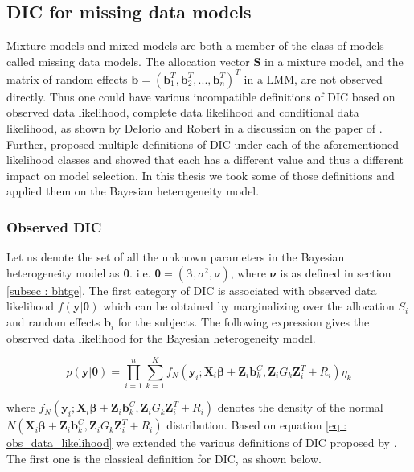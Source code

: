 \subsection{DIC for missing data models}
\label{subsec : DIC_missing_data_models}
Mixture models and mixed models are both a member of the class of models called missing data models. The allocation vector $\boldsymbol{S}$ in a mixture model, and the matrix of random effects $\boldsymbol{b}=(\boldsymbol{b}_1^T, \boldsymbol{b}_2^T, ..., \boldsymbol{b}_n^T)^T$ in a LMM, are not observed directly. Thus one could have various incompatible definitions of DIC based on observed data likelihood, complete data likelihood and conditional data likelihood, as shown by DeIorio and Robert in a discussion on the paper of \citet{spiegelhalter_bayesian_2002}. Further, \citet{celeux_deviance_2006} proposed multiple definitions of DIC under each of the aforementioned likelihood classes and showed that each has a different value and thus a different impact on model selection. In this thesis we took some of those definitions and applied them on the Bayesian heterogeneity model. 

\subsubsection{Observed DIC}
Let us denote the set of all the unknown parameters in the Bayesian heterogeneity model as $\boldsymbol{\theta}$. i.e. $\boldsymbol{\theta} = (\boldsymbol{\beta}, \sigma^2, \boldsymbol{\nu})$, where $\boldsymbol{\nu}$ is as defined in section \ref{subsec : bhtge}. The first category of DIC is associated with observed data likelihood $f(\boldsymbol{y}|\boldsymbol{\theta})$ which can be obtained by marginalizing over the allocation $S_i$ and random effects $\boldsymbol{b}_i$ for the subjects. The following expression gives the observed data likelihood for the Bayesian heterogeneity model.

\begin{equation}
\label{eq : obs_data_likelihood}
p(\boldsymbol{y}|\boldsymbol{\theta}) = \prod_{i=1}^n \sum_{k=1}^K f_N(\boldsymbol{y}_i; \boldsymbol{X}_i\boldsymbol{\beta} + \boldsymbol{Z}_i \boldsymbol{b}_k^C, \boldsymbol{Z}_{i} G_k \boldsymbol{Z}_{i}^T+ R_i) \eta_k
\end{equation}
 
where $f_N(\boldsymbol{y}_i; \boldsymbol{X}_i\boldsymbol{\beta} + \boldsymbol{Z}_i \boldsymbol{b}_k^C, \boldsymbol{Z}_{i} G_k \boldsymbol{Z}_{i}^T+ R_i)$ denotes the density of the normal $N(\boldsymbol{X}_i\boldsymbol{\beta} + \boldsymbol{Z}_i \boldsymbol{b}_k^C, \boldsymbol{Z}_{i} G_k \boldsymbol{Z}_{i}^T+ R_i)$ distribution. Based on equation \ref{eq : obs_data_likelihood} we extended the various definitions of DIC proposed by \citet{celeux_deviance_2006}. The first one is the classical definition for DIC, as shown below.

